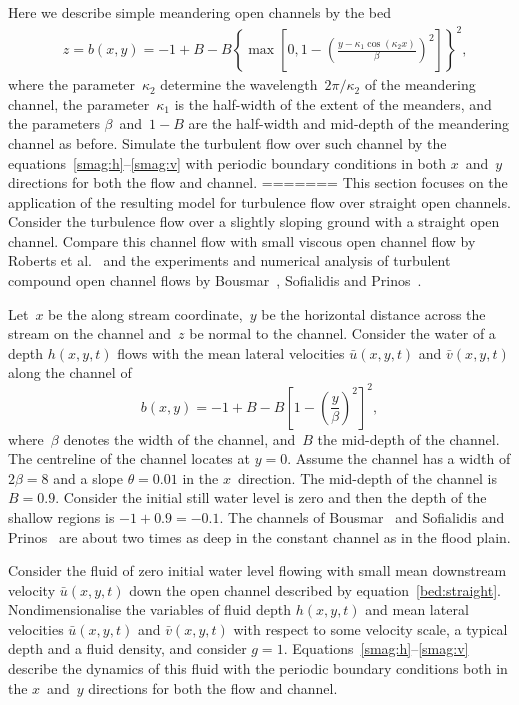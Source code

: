\documentclass[twocolumn]{afmc_art}
\newcommand{\uu}{{\bar u}}
\newcommand{\vv}{{\bar v}}
\begin{document}
Here we describe simple meandering open channels by the bed
\begin{align}&
z=b(x,y)=-1+B-B\left\{\max\left[0,1-\left(\frac{y-\kappa_1\cos(\kappa_2x)}{\beta}\right)^2\right]\right\}^2,\label{bed:meander}
\end{align}
where the parameter~$\kappa_2$ determine the wavelength~$2\pi/\kappa_2$ of the meandering channel, the parameter~$\kappa_1$ is the half-width of the extent of the meanders, and the parameters $\beta$~and~$1-B$ are the half-width and mid-depth of the meandering channel as before.
Simulate the turbulent flow over such channel by the equations~\eqref{smag:h}--\eqref{smag:v} with periodic boundary conditions in both $x$~and~$y$ directions for both the flow and channel. 
=======
This section focuses on the application of the resulting model for turbulence flow over straight open channels. 
Consider the turbulence flow over a slightly sloping ground with a straight open channel. 
Compare this channel flow with small viscous open channel flow by Roberts et al.~\cite{Robertsli2006} and the experiments and numerical analysis of turbulent compound open channel flows by Bousmar~\cite{Bousmar2002}, Sofialidis and Prinos~\cite{Sofialidis:1999fk}. 
 
 Let~$x$ be the along stream coordinate,~$y$ be the horizontal distance across the stream on the channel and~$z$ be normal to the channel. 
Consider the water of a depth $h(x,y,t)$ flows with the mean lateral velocities $\uu(x,y,t)$ and $\vv(x,y,t)$ along the channel of
\begin{equation}
b(x,y)=-1+B-B\left[1-\left(\frac{y}{\beta}\right)^2\right]^2,\label{bed:straight}
\end{equation}
where~$\beta$ denotes the width of the channel, and~$B$ the mid-depth of the channel.  
The centreline of the channel locates at $y=0$.
Assume the channel has a width of  $2\beta=8$ and a slope $\theta=0.01$ in the $x$~direction.  
The mid-depth of the channel is $B=0.9$.
Consider the initial still water level is zero and then the depth of the shallow regions is $-1+0.9=-0.1$.
The channels of Bousmar~\cite{Bousmar2002} and Sofialidis and Prinos~\cite{Sofialidis:1999fk} are about two times as deep in the constant channel as in the flood plain.

Consider the fluid of zero initial water level flowing with small mean downstream velocity $\uu(x,y,t)$ down the open channel described by equation~\eqref{bed:straight}. 
Nondimensionalise the variables of fluid depth $h(x,y,t)$ and mean lateral velocities $\uu(x,y,t)$ and $\vv(x,y,t)$ with respect to some velocity scale, a typical depth and a fluid density, and consider $g=1$. 
Equations~\eqref{smag:h}--\eqref{smag:v} describe the dynamics of this fluid with the periodic boundary conditions both in the $x$~and~$y$ directions for both the flow and channel. 
\end{document}
